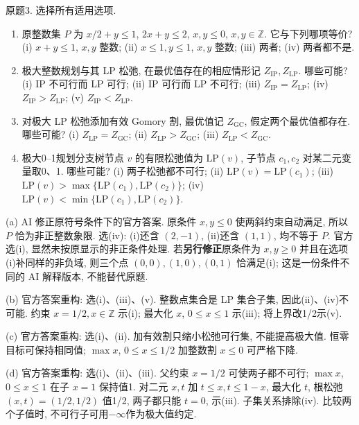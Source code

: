 \begin{exercise}\label{ass:15053-practice-q3}
原题3. 选择所有适用选项.
\begin{enumerate}[label=(\alph*)]
\item 原整数集 $P$ 为 $x/2+y\le1$, $2x+y\le2$, $x,y\le0$, $x,y\in\mathbb Z$. 它与下列哪项等价? (i) $x+y\le1$, $x,y$ 整数; (ii) $x\le1,y\le1$, $x,y$ 整数; (iii) 两者; (iv) 两者都不是.
\item 极大整数规划与其 LP 松弛, 在最优值存在的相应情形记 $Z_{\mathrm{IP}},Z_{\mathrm{LP}}$. 哪些可能? (i) IP 不可行而 LP 可行; (ii) IP 可行而 LP 不可行; (iii) $Z_{\mathrm{IP}}=Z_{\mathrm{LP}}$; (iv) $Z_{\mathrm{IP}}>Z_{\mathrm{LP}}$; (v) $Z_{\mathrm{IP}}<Z_{\mathrm{LP}}$.
\item 对极大 LP 松弛添加有效 Gomory 割, 最优值记 $Z_{\mathrm{GC}}$, 假定两个最优值都存在. 哪些可能? (i) $Z_{\mathrm{LP}}=Z_{\mathrm{GC}}$; (ii) $Z_{\mathrm{LP}}>Z_{\mathrm{GC}}$; (iii) $Z_{\mathrm{LP}}<Z_{\mathrm{GC}}$.
\item 极大0--1规划分支树节点 $v$ 的有限松弛值为 $\mathrm{LP}(v)$, 子节点 $c_1,c_2$ 对某二元变量取0、1. 哪些可能? (i) 两子松弛都不可行; (ii) $\mathrm{LP}(v)=\mathrm{LP}(c_1)$; (iii) $\mathrm{LP}(v)>\max\{\mathrm{LP}(c_1),\mathrm{LP}(c_2)\}$; (iv) $\mathrm{LP}(v)<\min\{\mathrm{LP}(c_1),\mathrm{LP}(c_2)\}$.
\end{enumerate}
\end{exercise}
\begin{solution}
(a) AI 修正原符号条件下的官方答案. 原条件 $x,y\le0$ 使两斜约束自动满足, 所以 $P$ 恰为非正整数象限. 选(iv): (i)还含 $(2,-1)$, (ii)还含 $(1,1)$, 均不等于 $P$. 官方选(i), 显然未按原显示的非正条件处理. 若\textbf{另行修正}原条件为 $x,y\ge0$ 并且在选项(i)补同样的非负域, 则三个点 $(0,0),(1,0),(0,1)$ 恰满足(i); 这是一份条件不同的 AI 解释版本, 不能替代原题.

(b) 官方答案重构: 选(i)、(iii)、(v). 整数点集合是 LP 集合子集, 因此(ii)、(iv)不可能. 约束 $x=1/2,x\in\mathbb Z$ 示(i); 最大化 $x$, $0\le x\le1$ 示(iii); 将上界改1/2示(v).

(c) 官方答案重构: 选(i)、(ii). 加有效割只缩小松弛可行集, 不能提高极大值. 恒零目标可保持相同值; $\max x$, $0\le x\le1/2$ 加整数割 $x\le0$ 可严格下降.

(d) 官方答案重构: 选(i)、(ii)、(iii). 父约束 $x=1/2$ 可使两子都不可行; $\max x$, $0\le x\le1$ 在子 $x=1$ 保持值1. 对二元 $x,t$ 加 $t\le x,t\le1-x$, 最大化 $t$, 根松弛 $(x,t)=(1/2,1/2)$ 值1/2, 两子都只能 $t=0$, 示(iii). 子集关系排除(iv). 比较两个子值时, 不可行子可用$-\infty$作为极大值约定.
\end{solution}

